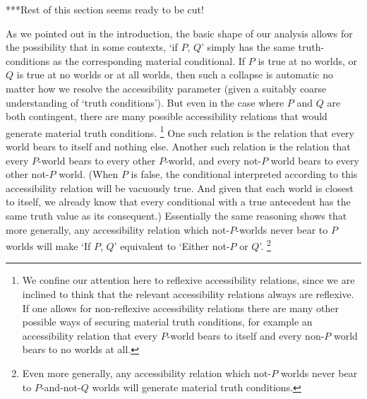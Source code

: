 \documentclass[If.tex]{subfiles}
\begin{document}
***Rest of this section seems ready to be cut!
 
As we pointed out in the introduction, the basic shape of our analysis allows for the possibility that in some contexts, ‘if $P$, $Q$’ simply has the same truth-conditions as the corresponding material conditional.  If $P$ is true at no worlds, or $Q$ is true at no worlds or at all worlds, then such a collapse is automatic no matter how we resolve the accessibility parameter (given a suitably coarse understanding of ‘truth conditions’).  But even in the case where $P$ and $Q$ are both contingent, there are many possible accessibility relations that would generate material truth conditions.%
\footnote{We confine our attention here to reflexive accessibility relations, since we are inclined to think that the relevant accessibility relations always are reflexive.  If one allows for non-reflexive accessibility relations there are many other possible ways of securing material truth conditions, for example an accessibility relation that every $P$-world bears to itself and every non-$P$ world bears to no worlds at all.}  
One such relation is the relation that every world bears to itself and nothing else.  Another such relation is the relation that every $P$-world bears to every other $P$-world, and every not-$P$ world bears to every other not-$P$ world.  (When $P$ is false, the conditional interpreted according to this accessibility relation will be vacuously true.  And given that each world is closest to itself, we already know that every conditional with a true antecedent has the same truth value as its consequent.)  Essentially the same reasoning shows that more generally, any accessibility relation which not-$P$-worlds never bear to $P$ worlds will make ‘If $P$, $Q$’ equivalent to ‘Either not-$P$ or $Q$’.%
\footnote{Even more generally, any accessibility relation which not-$P$ worlds never bear to $P$-and-not-$Q$ worlds will generate material truth conditions.  }  
\end{document}
